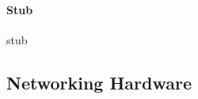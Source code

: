 \documentclass[../main.tex]{subfiles}
\begin{document}
\paragraph{Stub}

stub

\label{2:sec:networking_hardware}
\subsection{Networking Hardware}
\end{document}
